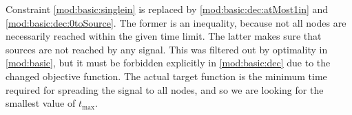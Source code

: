 Constraint \eqref{mod:basic:singlein} is replaced by \eqref{mod:basic:dec:atMost1in} and \eqref{mod:basic:dec:0toSource}. 
The former is an inequality, because not all nodes are necessarily reached within the given time limit.
The latter makes sure that sources are not reached by any signal. 
This was filtered out by optimality in \eqref{mod:basic}, but it must be forbidden explicitly in \eqref{mod:basic:dec} due to the changed objective function.
The actual target function is the minimum time required for spreading the signal to all nodes, and so we are looking for the smallest value of $t_{\text{max}}$.
%
